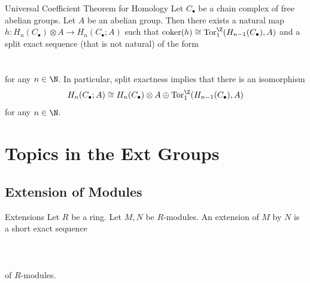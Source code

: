 \documentclass[a4paper]{article}
\begin{document}
\begin{thm}{Universal Coefficient Theorem for Homology}{} Let $C_\bullet$ be a chain complex of free abelian groups. Let $A$ be an abelian group. Then there exists a natural map $h:H_n(C_\bullet)\otimes A\to H_n(C_\bullet;A)$ such that $\text{coker}(h)\cong\text{Tor}_1^\Z(H_{n-1}(C_\bullet),A)$ and a split exact sequence (that is not natural) of the form \\~\\
\\
for any $n\in\N$. In particular, split exactness implies that there is an isomorphism $$H_n(C_\bullet;A)\cong H_n(C_\bullet)\otimes A\oplus\text{Tor}_1^\Z(H_{n-1}(C_\bullet),A)$$ for any $n\in\N$. 
\end{thm}

\pagebreak
\section{Topics in the Ext Groups}
\subsection{Extension of Modules}
\begin{defn}{Extensions}{} Let $R$ be a ring. Let $M,N$ be $R$-modules. An extension of $M$ by $N$ is a short exact sequence \\~\\
 \\~\\
of $R$-modules. 
\end{defn}
\end{document}
